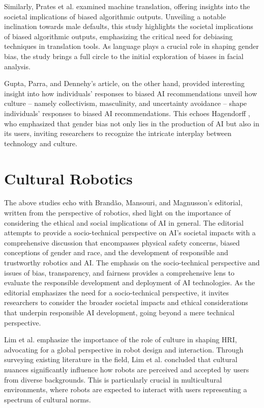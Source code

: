 Similarly, Prates et al. \cite{prates2019} examined machine translation, offering insights into the societal implications of biased algorithmic outputs. Unveiling a notable inclination towards male defaults, this study highlights the societal implications of biased algorithmic outputs, emphasizing the critical need for debiasing techniques in translation tools. As language plays a crucial role in shaping gender bias, the study brings a full circle to the initial exploration of biases in facial analysis.

Gupta, Parra, and Dennehy's \cite{gupta2021} article, on the other hand, provided interesting insight into how individuals' responses to biased AI recommendations unveil how culture – namely collectivism, masculinity, and uncertainty avoidance – shape individuals' responses to biased AI recommendations. This echoes Hagendorff \cite{hagendorff2020}, who emphasized that gender bias not only lies in the production of AI but also in its users, inviting researchers to recognize the intricate interplay between technology and culture.

\section{Cultural Robotics}
The above studies echo with Brandão, Mansouri, and Magnusson's \cite{brandao2022} editorial, written from the perspective of robotics, shed light on the importance of considering the ethical and social implications of AI in general. The editorial attempts to provide a socio-technical perspective on AI's societal impacts with a comprehensive discussion that encompasses physical safety concerns, biased conceptions of gender and race, and the development of responsible and trustworthy robotics and AI. The emphasis on the socio-technical perspective and issues of bias, transparency, and fairness provides a comprehensive lens to evaluate the responsible development and deployment of AI technologies. As the editorial emphasizes the need for a socio-technical perspective, it invites researchers to consider the broader societal impacts and ethical considerations that underpin responsible AI development, going beyond a mere technical perspective.

Lim et al. \cite{lim2020} emphasize the importance of the role of culture in shaping HRI, advocating for a global perspective in robot design and interaction. Through surveying existing literature in the field, Lim et al. concluded that cultural nuances significantly influence how robots are perceived and accepted by users from diverse backgrounds. This is particularly crucial in multicultural environments, where robots are expected to interact with users representing a spectrum of cultural norms. 

